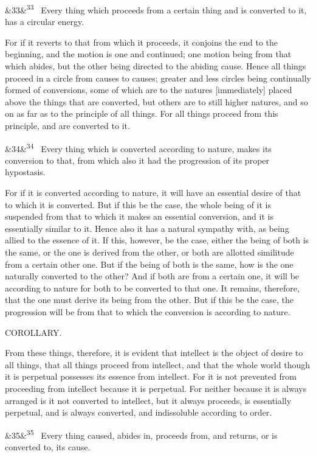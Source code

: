\documentclass[12pt]{article}
\newcommand{\para}[1][]{\par\noindent\ifx&#1&\else\textsuperscript{\footnotesize #1}~\fi}
\begin{document}
\para[33] Every thing which proceeds from a certain thing and is converted to it, has a circular energy.

For if it reverts to that from which it proceeds, it conjoins the end to the beginning, and the motion is one and continued; one motion being from that which abides, but the other being directed to the abiding cause. Hence all things proceed in a circle from causes to causes; greater and less circles being continually formed of conversions, some of which are to the natures [immediately] placed above the things that are converted, but others are to still higher natures, and so on as far as to the principle of all things. For all things proceed from this principle, and are converted to it.

\para[34] Every thing which is converted according to nature, makes its conversion to that, from which also it had the progression of its proper hypostasis.

For if it is converted according to nature, it will have an essential desire of that to which it is converted. But if this be the case, the whole being of it is suspended from that to which it makes an essential conversion, and it is essentially similar to it. Hence also it has a natural sympathy with, as being allied to the essence of it. If this, however, be the case, either the being of both is the same, or the one is derived from the other, or both are allotted similitude from a certain other one. But if the being of both is the same, how is the one naturally converted to the other? And if both are from a certain one, it will be according to nature for both to be converted to that one. It remains, therefore, that the one must derive its being from the other. But if this be the case, the progression will be from that to which the conversion is according to nature.

COROLLARY.

From these things, therefore, it is evident that intellect is the object of desire to all things, that all things proceed from intellect, and that the whole world though it is perpetual possesses its essence from intellect. For it is not prevented from proceeding from intellect because it is perpetual. For neither because it is always arranged is it not converted to intellect, but it always proceeds, is essentially perpetual, and is always converted, and indissoluble according to order.

\para[35] Every thing caused, abides in, proceeds from, and returns, or is converted to, its cause.
\end{document}
